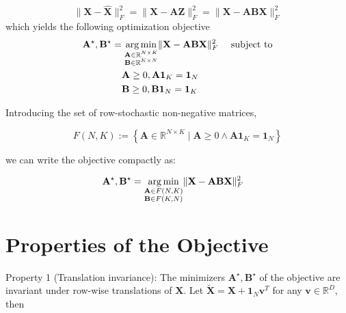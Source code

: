 \documentclass[oneside]{article}
\begin{document}
\begin{equation}
\label{eq:rss}
\| \mathbf{X} - \hat{\mathbf{X}} \|_F^2 = \| \mathbf{X} - \mathbf{A} \mathbf{Z} \|_F^2 =  \| \mathbf{X} -  \mathbf{A} \mathbf{B} \mathbf{X} \|_F^2
\end{equation}
which yields the following optimization objective
\begin{equation}
\label{eq:objective}
\begin{aligned}
\mathbf{A}^\star, \mathbf{B}^\star =& \; \underset{\begin{subarray}{c} \mathbf{A} \in \mathbb{R}^{N \times K} \\ 
    \mathbf{B} \in \mathbb{R}^{K \times N} \end{subarray}}{\arg \min} \| \mathbf{X} - \mathbf{A} \mathbf{B} \mathbf{X}\|_F^2 \quad \text{ subject to} \\
& \mathbf{A} \geq 0, \mathbf{A} \mathbf{1}_K = \mathbf{1}_N \\
& \mathbf{B} \geq 0, \mathbf{B} \mathbf{1}_N = \mathbf{1}_K
\end{aligned}
\end{equation}

Introducing the set of row-stochastic non-negative matrices,

\begin{equation}
    F(N, K) := \left\{ \mathbf{A} \in \mathbb{R}^{N \times K} \mid  \mathbf{A} \geq 0 \land \mathbf{A} \mathbf{1}_K = \mathbf{1}_N \right\}
\end{equation}

we can write the objective compactly as:

\begin{equation}
    \begin{aligned}
    \mathbf{A}^\star, \mathbf{B}^\star =& \; \underset{\begin{subarray}{c} \mathbf{A} \in F(N, K) \\ 
        \mathbf{B} \in F(K, N) \end{subarray}}{\arg \min} \| \mathbf{X} - \mathbf{A} \mathbf{B} \mathbf{X}\|_F^2
    \end{aligned}
\end{equation}

\section{Properties of the Objective}

Property 1 (Translation invariance): The minimizers $\mathbf{A}^\star, \mathbf{B}^\star$ of the objective are invariant under row-wise translations of $\mathbf{X}$. Let $\tilde{\mathbf{X}} = \mathbf{X} + \mathbf{1}_N \mathbf{v}^T$ for any $\mathbf{v} \in \mathbb{R}^D$, then
\end{document}

